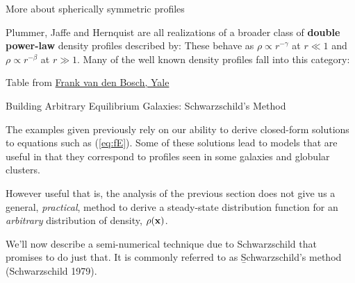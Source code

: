 \documentclass[letterpaper,landscape]{slides}
\begin{document}
\begin{slide}
\begin{center}
{\large \color{red} 
                  More about spherically symmetric profiles  }
\end{center}

Plummer, Jaffe and Hernquist are all realizations of a broader class of {\bf double
power-law} density profiles described by:
These behave as $\rho \propto r^{-\gamma}$ at $r \ll 1$ and $\rho \propto
r^{-\beta}$ at $r \gg 1$. Many of the well known density profiles fall into
this category:
\begin{center}
\vskip -0.5in
\end{center}
\begin{flushright}
\vskip -0.2in
Table from \href{http://www.astro.yale.edu/vdbosch/lecture2.pdf}{Frank van den Bosch, Yale}
\end{flushright}

\vfill
\end{slide}


\begin{slide}
\begin{center}
{\large \color{red} 
                  Building Arbitrary Equilibrium Galaxies: Schwarzschild's Method  }
\end{center}

The examples given previously rely on our ability to derive closed-form
solutions to equations such as (\ref{eq:fE}).  Some of these solutions lead
to models that are useful in that they correspond to profiles seen in some
galaxies and globular clusters.

However useful that is, the analysis of the previous section does not give
us a general, {\em practical}, method to derive a steady-state distribution
function for an {\em arbitrary} distribution of density, $\rho({\bf x})$.

We'll now describe a semi-numerical technique due to Schwarzschild that
promises to do just that. It is commonly referred to as \b{Schwarzschild's method}
(Schwarzschild 1979).

\vfill
\end{slide}
\end{document}
